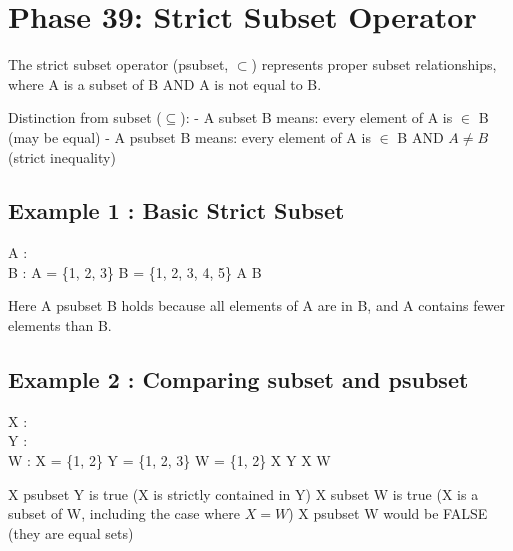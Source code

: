 \documentclass[a4paper,10pt,fleqn]{article}
\begin{document}
\section*{Phase 39: Strict Subset Operator}

\noindent The strict subset operator (psubset, $\subset$) represents proper subset relationships, where A is a subset of B AND A is not equal to B.

\bigskip

\noindent Distinction from subset ($\subseteq$): - A subset B means: every element of A is $\in$ B (may be equal) - A psubset B means: every element of A is $\in$ B AND $A \neq B$ (strict inequality)

\bigskip

\subsection*{Example 1 : Basic Strict Subset}

\begin{axdef}
A : \power \nat \\
B : \power \nat
\where
A = \{1, 2, 3\} \land B = \{1, 2, 3, 4, 5\} \land A \subset B
\end{axdef}

\noindent Here A psubset B holds because all elements of A are in B, and A contains fewer elements than B.

\bigskip

\subsection*{Example 2 : Comparing subset and psubset}

\begin{axdef}
X : \power \nat \\
Y : \power \nat \\
W : \power \nat
\where
X = \{1, 2\} \land Y = \{1, 2, 3\} \land W = \{1, 2\} \land X \subset Y \land X \subseteq W
\end{axdef}

\noindent X psubset Y is true (X is strictly contained in Y) X subset W is true (X is a subset of W, including the case where $X = W$) X psubset W would be FALSE (they are equal sets)

\bigskip
\end{document}
